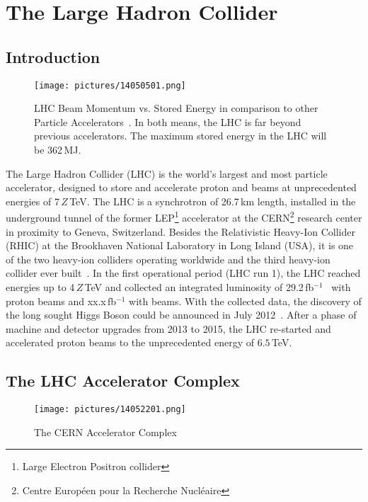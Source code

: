 \chapter{The Large Hadron Collider}\label{thelhc}
%
\section*{Introduction}
%
\begin{figure}[b]
  \centering
  \texttt{[image: pictures/14050501.png]}
  \caption{LHC Beam Momentum vs. Stored Energy in comparison to other Particle Accelerators~\cite{Christiane:1260465}. In both means, the LHC is far beyond previous accelerators. The maximum stored energy in the LHC will be 362\,MJ. } \label{pic:14050501} 
\end{figure}
%
The Large Hadron Collider (LHC) is the world's largest and most particle accelerator, designed to store and accelerate proton and \lead beams at unprecedented energies of 7$\,Z\,$TeV. The LHC is a synchrotron of 26.7\,km length, installed in the underground tunnel of the former LEP\footnote{Large Electron Positron collider} accelerator at the CERN\footnote{Centre Europ\'{e}en pour la Recherche Nucl\'{e}aire} research center in proximity to Geneva, Switzerland. Besides the Relativistic Heavy-Ion Collider (RHIC) at the Brookhaven National Laboratory in Long Island (USA), it is one of the two heavy-ion colliders operating worldwide and the third heavy-ion collider ever built~\cite{Fischer2014}. In the first operational period (LHC run 1), the LHC reached energies up to 4$\,Z\,$TeV and collected an integrated luminosity of 29.2\,fb$^{-1}$~\cite{lamont_moyab101} with proton beams and xx.x\,fb$^{-1}$ with \lead beams. With the collected data, the discovery of the long sought Higgs Boson could be announced in July 2012~\cite{}. After a phase of machine and detector upgrades from 2013 to 2015, the LHC re-started and accelerated proton beams to the unprecedented energy of $6.5\,$TeV.
%
%
%
%
%

\section{The LHC Accelerator Complex}

  \begin{figure}[t]
  \centering
  \texttt{[image: pictures/14052201.png]}
  \caption{ The CERN Accelerator Complex }  
  \label{pic:14052201}
  \end{figure}

